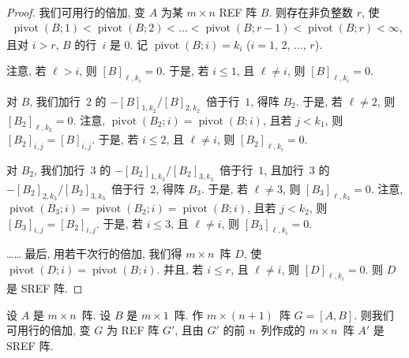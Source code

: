 \documentclass[../libro.tex]{subfiles}
\begin{document}
\begin{proof}
    我们可用行的倍加,
    变 \(A\) 为某 \(m \times n\) REF 阵 \(B\).
    则存在非负整数 \(r\), 使
    \begin{align*}
        \operatorname{pivot} {(B; 1)}
        < \operatorname{pivot} {(B; 2)}
        < \dots
        < \operatorname{pivot} {(B; r-1)}
        < \operatorname{pivot} {(B; r)}
        < \infty,
    \end{align*}
    且对 \(i > r\),
    \(B\) 的行~\(i\) 是 \(0\).
    记 \(\operatorname{pivot} {(B; i)} = k_i\)
    (\(i = 1\), \(2\), \(\dots\), \(r\)).

    注意, 若 \(\ell > i\), 则 \([B]_{\ell,k_i} = 0\).
    于是, 若 \(i \leq 1\),
    且 \(\ell \neq i\),
    则 \([B]_{\ell,k_i} = 0\).

    对 \(B\),
    我们加行~\(2\) 的
    \(-[B]_{1,k_2} / [B]_{2,k_2}\)~倍于行~\(1\),
    得阵 \(B_2\).
    于是, 若 \(\ell \neq 2\), 则 \([B_2]_{\ell,k_2} = 0\).
    注意, \(\operatorname{pivot} {(B_2; i)}
    = \operatorname{pivot} {(B; i)}\),
    且若 \(j < k_1\),
    则 \([B_2]_{i,j} = [B]_{i,j}\).
    于是, 若 \(i \leq 2\),
    且 \(\ell \neq i\),
    则 \([B_2]_{\ell,k_i} = 0\).

    对 \(B_2\),
    我们加行~\(3\) 的
    \(-[B_2]_{1,k_3} / [B_2]_{3,k_3}\)~倍于行~\(1\),
    且加行~\(3\) 的
    \(-[B_2]_{2,k_3} / [B_2]_{3,k_3}\)~倍于行~\(2\),
    得阵 \(B_3\).
    于是, 若 \(\ell \neq 3\), 则 \([B_3]_{\ell,k_3} = 0\).
    注意, \(\operatorname{pivot} {(B_3; i)}
        = \operatorname{pivot} {(B_2; i)}
    = \operatorname{pivot} {(B; i)}\),
    且若 \(j < k_2\),
    则 \([B_3]_{i,j} = [B_2]_{i,j}\).
    于是, 若 \(i \leq 3\),
    且 \(\ell \neq i\),
    则 \([B_3]_{\ell,k_i} = 0\).

    ……
    最后, 用若干次行的倍加,
    我们得 \(m \times n\)~阵 \(D\),
    使 \(\operatorname{pivot} {(D; i)}
    = \operatorname{pivot} {(B; i)}\).
    并且, 若 \(i \leq r\),
    且 \(\ell \neq i\),
    则 \([D]_{\ell,k_i} = 0\).
    则 \(D\) 是 SREF 阵.
\end{proof}

\begin{theorem}
    设 \(A\) 是 \(m \times n\)~阵.
    设 \(B\) 是 \(m \times 1\)~阵.
    作 \(m \times (n + 1)\)~阵
    \(G = [A, B]\).
    则我们可用行的倍加,
    变 \(G\) 为 REF 阵 \(G'\),
    且由 \(G'\) 的前 \(n\)~列作成的
    \(m \times n\)~阵 \(A'\)
    是 SREF 阵.
\end{theorem}
\end{document}
